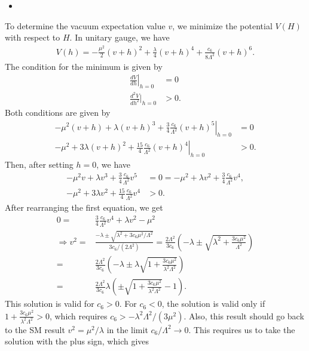 \answer{}
\begin{itemize}
    \item [(a)]
\end{itemize}
To determine the vacuum expectation value $v$, we minimize the potential $V(H)$ with respect to $H$. In unitary gauge, we have
\begin{align}
    V(h) = -\frac{\mu^2}{2} (v+h)^2 + \frac{\lambda}{4} (v+h)^4 + \frac{c_6}{8\Lambda^2} (v+h)^6.
\end{align}
The condition for the minimum is given by
\begin{align}
    \left.\frac{dV}{dh}\right|_{h=0} &= 0\\
    \frac{d^2V}{dh^2}\bigg|_{h=0} &> 0.
\end{align}
Both conditions are given by
\begin{align}
    \left.-\mu^2 (v+h) + \lambda (v+h)^3 + \frac{3}{4}\frac{c_6}{\Lambda^2} (v+h)^5 \right|_{h=0} &= 0\\
    \left. -\mu^2 +3\lambda (v+h)^2 +   \frac{15}{4}\frac{c_6}{\Lambda^2} (v+h)^4 \right|_{h=0} &> 0.
\end{align}
Then, after setting $h=0$, we have
\begin{align}
    -\mu^2 v + \lambda v^3 + \frac{3}{4}\frac{c_6}{\Lambda^2} v^5 &= 0=-\mu^2  + \lambda v^2 + \frac{3}{4}\frac{c_6}{\Lambda^2} v^4, \\
    -\mu^2 + 3\lambda v^2 + \frac{15}{4}\frac{c_6}{\Lambda^2} v^4 &> 0.
\end{align}
After rearranging the first equation, we get
\begin{align}
    0=&  \frac{3}{4}\frac{c_6}{\Lambda^2} v^4  +\lambda v^2 -\mu^2\\
    \Rightarrow v^2 =& \frac{-\lambda \pm \sqrt{\lambda^2 + 3 c_6 \mu^2/\Lambda^2}}{3 c_6/(2\Lambda^2)}=\frac{2\Lambda^2}{3 c_6} \left(-\lambda \pm \sqrt{\lambda^2 + \frac{3 c_6 \mu^2}{\Lambda^2}}\right)\\
    =& \frac{2\Lambda^2}{3 c_6} \left(-\lambda \pm \lambda \sqrt{1 + \frac{3 c_6 \mu^2}{\lambda^2 \Lambda^2}}\right)\\
    =& \frac{2\Lambda^2}{3 c_6} \lambda \left( \pm\sqrt{1 + \frac{3 c_6 \mu^2}{\lambda^2 \Lambda^2}} - 1\right).
\end{align}
This solution is valid for $c_6>0$. For $c_6<0$, the solution is valid only if $1 + \frac{3 c_6 \mu^2}{\lambda^2 \Lambda^2} >0$, which requires $c_6 > -\lambda^2 \Lambda^2/(3\mu^2)$. Also, this result should go back to the SM result $v^2 = \mu^2/\lambda$ in the limit $c_6/\Lambda^2 \to 0$. This requires us to take the solution with the plus sign, which gives
